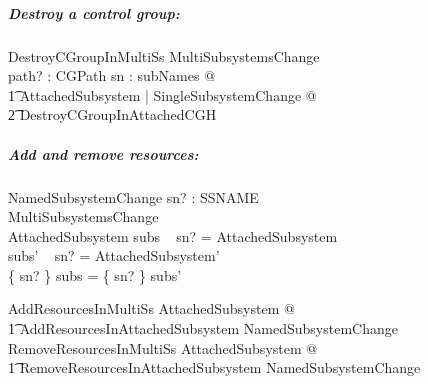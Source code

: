 \documentclass[a4paper,twoside,12pt]{article}
\begin{document}
\subparagraph{Destroy a control group:}

\begin{schema}{DestroyCGroupInMultiSs}
MultiSubsystemsChange \\
path? : CGPath
\where
\forall sn : subNames @ \\
\t1 \exists \Delta AttachedSubsystem | SingleSubsystemChange @ \\
    \t2 DestroyCGroupInAttachedCGH
\end{schema}

\subparagraph{Add and remove resources:}

\begin{schema}{NamedSubsystemChange}
sn? : SSNAME \\
MultiSubsystemsChange \\
\Delta AttachedSubsystem
\where
subs ~ sn? = \theta AttachedSubsystem \\
subs' ~ sn? = \theta AttachedSubsystem' \\
\{ sn? \} \ndres subs = \{ sn? \} \ndres subs'
\end{schema}

\begin{zed}
AddResourcesInMultiSs   \exists \Delta AttachedSubsystem @ \\
    \t1 AddResourcesInAttachedSubsystem \land NamedSubsystemChange
\also
RemoveResourcesInMultiSs   \exists \Delta AttachedSubsystem @ \\
    \t1 RemoveResourcesInAttachedSubsystem \land NamedSubsystemChange
\end{zed}


\clearpage

\appendix
\end{document}
